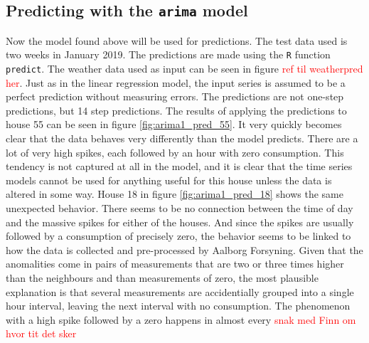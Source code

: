 \subsection{Predicting with the \texttt{arima} model}
Now the model found above will be used for predictions. The test data used is two weeks in January 2019. The predictions are made using the \texttt{R} function \texttt{predict}. The  weather data used as input can be seen in figure 
\textcolor{red}{ref til weatherpred her}. Just as in the linear regression model, the input series is assumed to be a perfect prediction without measuring errors. The predictions are not one-step predictions, but 14 step predictions. The results of applying the predictions to house 55 can be seen in figure \cref{fig:arima1_pred_55}. It very quickly becomes clear that the data behaves very differently than the model predicts. There are a lot of very high spikes, each followed by an hour with zero consumption. This tendency is not captured at all in the model, and it is clear that the time series models cannot be used for anything useful for this house unless the data is altered in some way. House 18 in figure \cref{fig:arima1_pred_18} shows the same unexpected behavior. There seems to be no connection between the time of day and the massive spikes for either of the houses. And since the spikes are usually followed by a consumption of precisely zero, the behavior seems to be linked to how the data is collected and pre-processed by Aalborg Forsyning. Given that the anomalities come in pairs of measurements that are two or three times higher than the neighbours and than measurements of zero, the most plausible explanation is that several measurements are accidentially grouped into a single hour interval, leaving the next interval with no consumption. The phenomenon with a high spike followed by a zero happens in almost every \textcolor{red}{snak med Finn om hvor tit det sker}


